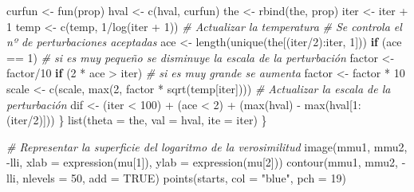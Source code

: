 \documentclass[
]{book}
\newenvironment{Shaded}{\begin{snugshade}}{\end{snugshade}}
\newcommand{\AttributeTok}[1]{\textcolor[rgb]{0.77,0.63,0.00}{#1}}
\newcommand{\CommentTok}[1]{\textcolor[rgb]{0.56,0.35,0.01}{\textit{#1}}}
\newcommand{\ConstantTok}[1]{\textcolor[rgb]{0.00,0.00,0.00}{#1}}
\newcommand{\ControlFlowTok}[1]{\textcolor[rgb]{0.13,0.29,0.53}{\textbf{#1}}}
\newcommand{\DecValTok}[1]{\textcolor[rgb]{0.00,0.00,0.81}{#1}}
\newcommand{\FunctionTok}[1]{\textcolor[rgb]{0.00,0.00,0.00}{#1}}
\newcommand{\NormalTok}[1]{#1}
\newcommand{\OtherTok}[1]{\textcolor[rgb]{0.56,0.35,0.01}{#1}}
\newcommand{\SpecialCharTok}[1]{\textcolor[rgb]{0.00,0.00,0.00}{#1}}
\newcommand{\StringTok}[1]{\textcolor[rgb]{0.31,0.60,0.02}{#1}}
\theoremstyle{break}
\theoremstyle{definition}
\theoremstyle{definition}
\theoremstyle{definition}
\theoremstyle{definition}
\theoremstyle{remark}
\begin{document}
\begin{Shaded}
\begin{Highlighting}[]
\NormalTok{    curfun }\OtherTok{\textless{}{-}} \FunctionTok{fun}\NormalTok{(prop)}
\NormalTok{    hval }\OtherTok{\textless{}{-}} \FunctionTok{c}\NormalTok{(hval, curfun)}
\NormalTok{    the }\OtherTok{\textless{}{-}} \FunctionTok{rbind}\NormalTok{(the, prop)}
\NormalTok{    iter }\OtherTok{\textless{}{-}}\NormalTok{ iter }\SpecialCharTok{+} \DecValTok{1}
\NormalTok{    temp }\OtherTok{\textless{}{-}} \FunctionTok{c}\NormalTok{(temp, }\DecValTok{1}\SpecialCharTok{/}\FunctionTok{log}\NormalTok{(iter }\SpecialCharTok{+} \DecValTok{1}\NormalTok{))  }\CommentTok{\# Actualizar la temperatura}
    \CommentTok{\# Se controla el nº de perturbaciones aceptadas}
\NormalTok{    ace }\OtherTok{\textless{}{-}} \FunctionTok{length}\NormalTok{(}\FunctionTok{unique}\NormalTok{(the[(iter}\SpecialCharTok{/}\DecValTok{2}\NormalTok{)}\SpecialCharTok{:}\NormalTok{iter, }\DecValTok{1}\NormalTok{]))}
    \ControlFlowTok{if}\NormalTok{ (ace }\SpecialCharTok{==} \DecValTok{1}\NormalTok{) }
      \CommentTok{\# si es muy pequeño se disminuye la escala de la perturbación}
\NormalTok{      factor }\OtherTok{\textless{}{-}}\NormalTok{ factor}\SpecialCharTok{/}\DecValTok{10}
    \ControlFlowTok{if}\NormalTok{ (}\DecValTok{2} \SpecialCharTok{*}\NormalTok{ ace }\SpecialCharTok{\textgreater{}}\NormalTok{ iter) }
      \CommentTok{\# si es muy grande se aumenta}
\NormalTok{      factor }\OtherTok{\textless{}{-}}\NormalTok{ factor }\SpecialCharTok{*} \DecValTok{10}
\NormalTok{    scale }\OtherTok{\textless{}{-}} \FunctionTok{c}\NormalTok{(scale, }\FunctionTok{max}\NormalTok{(}\DecValTok{2}\NormalTok{, factor }\SpecialCharTok{*} \FunctionTok{sqrt}\NormalTok{(temp[iter])))  }\CommentTok{\# Actualizar la escala de la perturbación}
\NormalTok{    dif }\OtherTok{\textless{}{-}}\NormalTok{ (iter }\SpecialCharTok{\textless{}} \DecValTok{100}\NormalTok{) }\SpecialCharTok{+}\NormalTok{ (ace }\SpecialCharTok{\textless{}} \DecValTok{2}\NormalTok{) }\SpecialCharTok{+}\NormalTok{ (}\FunctionTok{max}\NormalTok{(hval) }\SpecialCharTok{{-}} \FunctionTok{max}\NormalTok{(hval[}\DecValTok{1}\SpecialCharTok{:}\NormalTok{(iter}\SpecialCharTok{/}\DecValTok{2}\NormalTok{)]))}
\NormalTok{  \}}
  \FunctionTok{list}\NormalTok{(}\AttributeTok{theta =}\NormalTok{ the, }\AttributeTok{val =}\NormalTok{ hval, }\AttributeTok{ite =}\NormalTok{ iter)}
\NormalTok{\}}

\CommentTok{\# Representar la superficie del logaritmo de la verosimilitud}
\FunctionTok{image}\NormalTok{(mmu1, mmu2, }\SpecialCharTok{{-}}\NormalTok{lli, }\AttributeTok{xlab =} \FunctionTok{expression}\NormalTok{(mu[}\DecValTok{1}\NormalTok{]), }\AttributeTok{ylab =} \FunctionTok{expression}\NormalTok{(mu[}\DecValTok{2}\NormalTok{]))}
\FunctionTok{contour}\NormalTok{(mmu1, mmu2, }\SpecialCharTok{{-}}\NormalTok{lli, }\AttributeTok{nlevels =} \DecValTok{50}\NormalTok{, }\AttributeTok{add =} \ConstantTok{TRUE}\NormalTok{)}
\FunctionTok{points}\NormalTok{(starts, }\AttributeTok{col =} \StringTok{"blue"}\NormalTok{, }\AttributeTok{pch =} \DecValTok{19}\NormalTok{)}


\end{Highlighting}
\end{Shaded}
\end{document}

